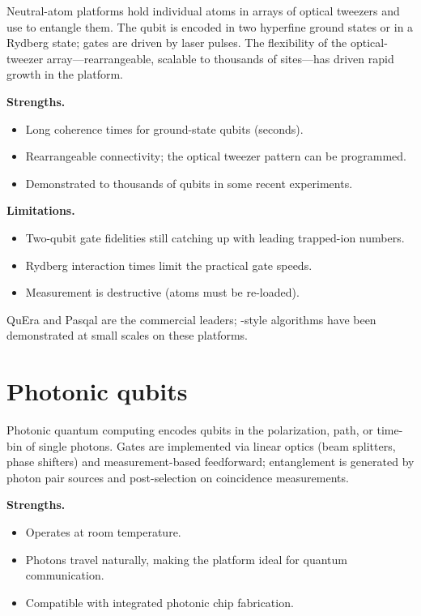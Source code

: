 Neutral-atom platforms hold individual atoms in arrays of optical tweezers and use  to entangle them. The qubit is encoded in two hyperfine ground states or in a Rydberg state; gates are driven by laser pulses. The flexibility of the optical-tweezer array---rearrangeable, scalable to thousands of sites---has driven rapid growth in the platform.

\textbf{Strengths.}
\begin{itemize}
\item Long coherence times for ground-state qubits (seconds).
\item Rearrangeable connectivity; the optical tweezer pattern can be programmed.
\item Demonstrated to thousands of qubits in some recent experiments.
\end{itemize}

\textbf{Limitations.}
\begin{itemize}
\item Two-qubit gate fidelities still catching up with leading trapped-ion numbers.
\item Rydberg interaction times limit the practical gate speeds.
\item Measurement is destructive (atoms must be re-loaded).
\end{itemize}

QuEra and Pasqal are the commercial leaders; \citet{harrow_quantum_2009}-style algorithms have been demonstrated at small scales on these platforms.

\section{Photonic qubits}

Photonic quantum computing encodes qubits in the polarization, path, or time-bin of single photons. Gates are implemented via linear optics (beam splitters, phase shifters) and measurement-based feedforward; entanglement is generated by photon pair sources and post-selection on coincidence measurements.

\textbf{Strengths.}
\begin{itemize}
\item Operates at room temperature.
\item Photons travel naturally, making the platform ideal for quantum communication.
\item Compatible with integrated photonic chip fabrication.
\end{itemize}

